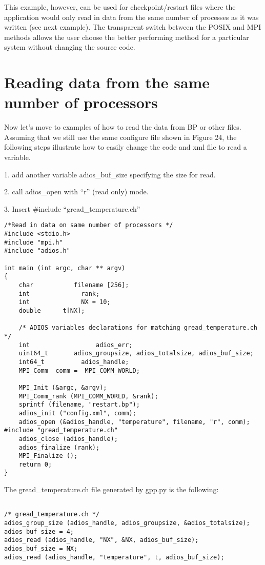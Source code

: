This example, however, can be used for checkpoint/restart files where the application 
would only read in data from the same number of processes as it was written (see 
next example). The transparent switch between the POSIX and MPI methods allows 
the user choose the better performing method for a particular system without changing 
the source code. 

\section{Reading data from the same number of processors}

Now let's move to examples of how to read the data from BP or other files.  Assuming 
that we still use the same configure file shown in Figure 24, the following steps 
illustrate how to easily change the code and xml file to read a variable. 

1. add another variable adios\_buf\_size specifying the size for read.

2. call adios\_open with ``r'' (read only) mode.

3. Insert \#include ``gread\_temperature.ch''

\begin{lstlisting}[alsolanguage=C,caption=Example of a generated gread\_temperature.ch 
file examples/C/manual/3\_adios\_read.c]
/*Read in data on same number of processors */
#include <stdio.h>
#include "mpi.h"
#include "adios.h"

int main (int argc, char ** argv) 
{
    char           filename [256];
    int              rank;
    int              NX = 10;
    double      t[NX];

    /* ADIOS variables declarations for matching gread_temperature.ch */
    int                  adios_err;
    uint64_t       adios_groupsize, adios_totalsize, adios_buf_size;
    int64_t          adios_handle;
    MPI_Comm  comm =  MPI_COMM_WORLD;

    MPI_Init (&argc, &argv);
    MPI_Comm_rank (MPI_COMM_WORLD, &rank);
    sprintf (filename, "restart.bp");
    adios_init ("config.xml", comm);
    adios_open (&adios_handle, "temperature", filename, "r", comm);
#include "gread_temperature.ch"
    adios_close (adios_handle);
    adios_finalize (rank);
    MPI_Finalize ();
    return 0;
}
\end{lstlisting}

The gread\_temperature.ch file generated by gpp.py is the following:

\begin{lstlisting}[caption=Example of a generated gread\_temperature.ch 
file]

/* gread_temperature.ch */
adios_group_size (adios_handle, adios_groupsize, &adios_totalsize);
adios_buf_size = 4;
adios_read (adios_handle, "NX", &NX, adios_buf_size);
adios_buf_size = NX;
adios_read (adios_handle, "temperature", t, adios_buf_size);
\end{lstlisting}


